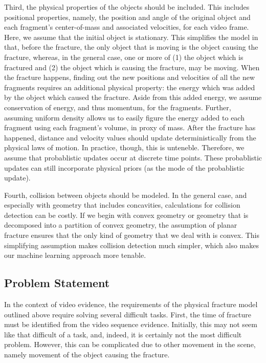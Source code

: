 \documentclass[runningheads]{llncs}
\begin{document}
Third, the physical properties of the objects should be included. 
This includes positional properties, namely, the position and angle of the 
original object and each fragment's center-of-mass and associated velocities, 
for each video frame. Here, we assume that the initial object is 
stationary. This simplifies the model in that, before the fracture, the only 
object that is moving is the object causing the fracture, whereas, in the 
general case, one or more of (1) the object which is fractured and (2) the 
object which is causing the fracture, may be moving. When the fracture happens, 
finding out the new positions and velocities of all the new fragments requires 
an additional physical property: the energy which was added by the object which 
caused the fracture. Aside from this added energy, we assume conservation of 
energy, and thus momentum, for the fragments. Further, assuming uniform density 
allows us to easily figure the energy added to each fragment using each 
fragment's volume, in proxy of mass.
After the fracture has 
happened, distance and velocity values should update deterministically from 
the physical laws of motion. In practice, though, this is unteneble. Therefore, 
we assume that probablistic updates occur at discrete time points. These 
probablistic updates can still incorporate physical priors (as the 
mode of the probablistic update).

Fourth, collision between objects should be modeled. In the general case, and 
especially with geometry that includes concavities, calculations for collision 
detection can be costly. If we begin with convex geometry or geometry 
that is decomposed into a partition of convex geometry, the assumption of planar 
fracture ensures that the only kind of geometry that we deal with is convex. 
This simplifying assumption makes 
collision detection much simpler, which also makes our machine learning approach 
more tenable.

\subsection{Problem Statement}

In the context of video evidence, the requirements of the physical fracture 
model outlined above require solving several 
difficult tasks. First, the time of fracture must be identified from the video 
sequence evidence. Initially, this may not 
seem like that difficult of a task, and, indeed, it is certainly not the most 
difficult problem. However, this can be complicated due to other movement in the 
scene, namely movement of the object causing the fracture.
\end{document}
